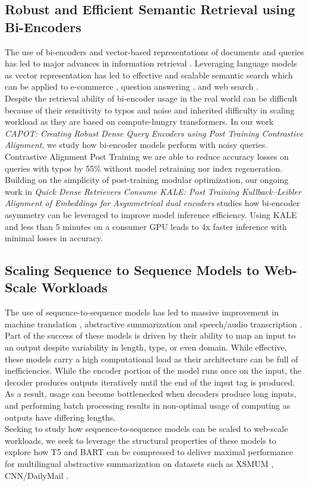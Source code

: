 \subsection{Robust and Efficient Semantic Retrieval using Bi-Encoders}
The use of bi-encoders and vector-based representations of documents and queries has led to major advances in information retrieval \cite{Karpukhin2020DensePR}. Leveraging language models as vector representation has led to effective and scalable semantic search which can be applied to e-commerce \cite{Magnani2022SemanticRA} \cite{Bi2020ATE}, question answering \cite{Qu2021RocketQAAO}, and web search \cite{Xiong2021ApproximateNN}. \\
Despite the retrieval ability of bi-encoder usage in the real world can be difficult because of their sensitivity to typos and noise \cite{Sidiropoulos2022AnalysingTR} and inherited difficulty in scaling workload as they are based on compute-hungry transformers.  In our work \textit{CAPOT: Creating Robust Dense Query Encoders using Post Training Contrastive Alignment}, we study how bi-encoder models perform with noisy queries. Contrastive Alignment Post Training we are able to reduce accuracy losses on queries with typos by 55\% without model retraining nor index regeneration.  \\
Building on the simplicity of post-training modular optimization, our ongoing work in
\textit{Quick Dense Retrievers Consume KALE: Post Training Kullback–Leibler Alignment of Embeddings for Asymmetrical dual encoders} studies how bi-encoder asymmetry can be leveraged to improve model inference efficiency. Using KALE and less than 5 minutes on a consumer GPU leads to 4x faster inference with minimal losses in accuracy. 
\subsection{Scaling Sequence to Sequence Models to Web-Scale Workloads}
The use of sequence-to-sequence models has led to massive improvement in machine translation \cite{Vaswani2017AttentionIA}, abstractive summarization \cite{Zhang2020PEGASUSPW} and speech/audio transcription \cite{Radford2022RobustSR}. Part of the success of these models is driven by their ability to map an input to an output despite variability in length, type, or even domain. While effective, these models carry a high computational load as their architecture can be full of inefficiencies. While the encoder portion of the model runs once on the input, the decoder produces outputs iteratively until the end of the input tag is produced. As a result, usage can become bottlenecked when decoders produce long inputs, and performing batch processing results in non-optimal usage of computing as outputs have differing lengths. \\
Seeking to study how sequence-to-sequence models can be scaled to web-scale workloads, we seek to leverage the structural properties of these models to explore how T5 \cite{Raffel2020ExploringTL} and BART \cite{Lewis2020BARTDS} can be compressed to deliver maximal performance for multilingual abstractive summarization on datasets such as XSMUM \cite{Narayan2018DontGM}, CNN/DailyMail \cite{Nallapati2016AbstractiveTS}. \\
